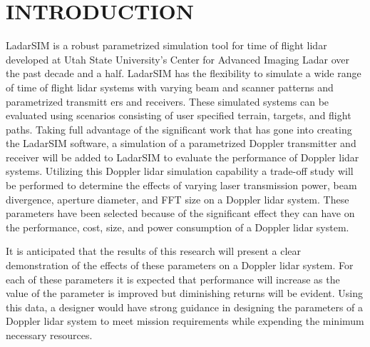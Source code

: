 \chapter{INTRODUCTION}
\thispagestyle{empty}

LadarSIM is a robust parametrized simulation tool for time of flight lidar
developed at Utah State University's Center
for Advanced Imaging Ladar over the past decade and a half.
LadarSIM has the flexibility to simulate a wide range of time of flight
lidar systems with varying beam and scanner patterns and parametrized transmitt
ers and receivers.
These simulated systems can be evaluated using scenarios consisting of
user specified terrain, targets, and flight paths.
Taking full advantage of the significant work that has gone into creating
the LadarSIM software, a simulation of a parametrized Doppler transmitter
and receiver will be added to LadarSIM to evaluate the performance of Doppler
lidar systems.
Utilizing this Doppler lidar simulation capability a trade-off study will
be performed to determine the effects of varying laser transmission power,
beam divergence, aperture diameter, and FFT size on a Doppler lidar system.
These parameters have been selected because of the significant effect they
can have on the performance, cost, size, and power consumption of a Doppler
lidar system.

It is anticipated that the results of this research will present a clear
demonstration of the effects of these parameters on a Doppler lidar system.
For each of these parameters it is expected that performance will increase
as the value of the parameter is improved but diminishing returns will
be evident.
Using this data, a designer would have strong guidance in designing the
parameters of a Doppler lidar system to meet mission requirements while
expending the minimum necessary resources.